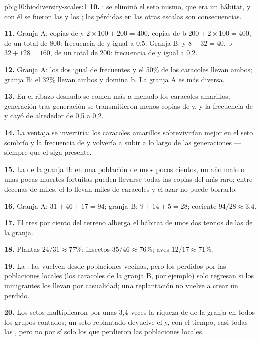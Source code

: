 \begin{solution}{pb:g10:biodiversity-scales:1}
\textbf{10.} : se eliminó el seto mismo, que era un hábitat,
y con él se fueron las  y los ; las pérdidas en las otras
escalas son consecuencias.

\textbf{11.} Granja A: copias de y $2 \times 100 + 200 = 400$, copias
de b $200 + 2 \times 100 = 400$, de un total de 800: frecuencia de y
igual a 0,5. Granja B: y $8 + 32 = 40$, b $32 + 128 = 160$, de un total
de 200: frecuencia de y igual a 0,2.

\textbf{12.} Granja A: los dos  igual de frecuentes y el 50\% de
los caracoles llevan ambos; granja B: el 32\% llevan ambos y domina b.
La granja A es más diversa.

\textbf{13.} En el ribazo desnudo se comen más a menudo los caracoles
amarillos; generación tras generación se transmitieron menos copias de
y, y la frecuencia de y cayó de alrededor de 0,5 a 0,2.

\textbf{14.} La ventaja se invertiría: los caracoles amarillos
sobrevivirían mejor en el seto sombrío y la frecuencia de y volvería a
subir a lo largo de las generaciones --- siempre que el  siga
presente.

\textbf{15.} La de la granja B: en una población de unos pocos
cientos, un año malo o unas pocas muertes fortuitas pueden llevarse
todas las copias del  más raro; entre decenas de miles, el 
lo llevan miles de caracoles y el azar no puede borrarlo.

\textbf{16.} Granja A: $31 + 46 + 17 = 94$; granja B: $9 + 14 + 5 = 28$; cociente $94/28 \approx 3.4$.

\textbf{17.} El tres por ciento del terreno alberga el hábitat de unos
dos tercios de las  de la granja.

\textbf{18.} Plantas $24/31 \approx 77\%$; insectos $35/46 \approx 76\%$; aves $12/17 \approx 71\%$.

\textbf{19.} La : las  vuelven desde
poblaciones vecinas, pero los  perdidos por las poblaciones
locales (los caracoles de la granja B, por ejemplo) solo regresan si
los inmigrantes los llevan por casualidad; una replantación no vuelve a
crear un  perdido.

\textbf{20.} Los setos multiplicaron por unas 3,4 veces la riqueza de
 de la granja en todos los grupos contados; un seto replantado
devuelve el  y, con el tiempo, casi todas las , pero
no por sí solo los  que perdieron las poblaciones locales.
\end{solution}
